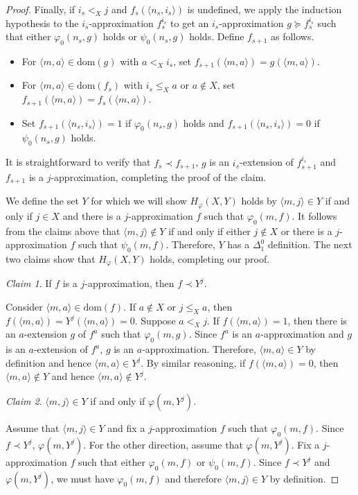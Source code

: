 \documentclass{amsart}
\theoremstyle{definition}
\theoremstyle{remark}
\newtheorem*{claim}{Claim}
\begin{document}
\begin{proof}
Finally, if $i_s <_X j$ and $f_s(\langle n_s,i_s \rangle)$ is undefined, we apply the induction hypothesis to the $i_s$-approximation $f_s^{i_s}$ to get an $i_s$-approximation 
$g \succeq f_s^{i_s}$ such that either $\varphi_0(n_s,g)$ holds or $\psi_0(n_s,g)$ holds. Define $f_{s+1}$ as follows. 
\begin{itemize}
\item For $\langle m,a \rangle \in \text{dom}(g)$ with $a <_X i_s$, set $f_{s+1}(\langle m,a \rangle) = g(\langle m,a \rangle)$. 
\item For $\langle m,a \rangle \in \text{dom}(f_s)$ with $i_s \leq_X a$ or $a \not \in X$, set $f_{s+1}(\langle m,a \rangle) = f_s(\langle m,a \rangle)$.
\item Set $f_{s+1}(\langle n_s,i_s \rangle) = 1$ if $\varphi_0(n_s,g)$ holds and $f_{s+1}(\langle n_s,i_s \rangle) = 0$ if $\psi_0(n_s,g)$ holds. 
\end{itemize}
It is straightforward to verify that $f_s \prec f_{s+1}$, $g$ is an $i_s$-extension of $f_{s+1}^{i_s}$ and $f_{s+1}$ is a $j$-approximation, completing the proof of the claim.

We define the set $Y$ for which we will show $H_{\varphi}(X,Y)$ holds by $\langle m,j \rangle \in Y$ if and only if $j \in X$ and there is a $j$-approximation $f$ such that $\varphi_0(m,f)$. It follows from the claims above that 
$\langle m,j \rangle \not \in Y$ if and only if either $j \not \in X$ or there is a $j$-approximation $f$ such that $\psi_0(m,f)$. Therefore, $Y$ has a $\Delta^0_1$ definition. 
The next two claims show that $H_{\varphi}(X,Y)$ holds, completing our proof.

\begin{claim}
If $f$ is a $j$-approximation, then $f \prec Y^j$. 
\end{claim}

Consider $\langle m,a \rangle \in \text{dom}(f)$. If $a \not \in X$ or $j \leq_X a$, then $f(\langle m,a \rangle) = Y^j(\langle m,a \rangle) = 0$. Suppose $a <_X j$. If 
$f(\langle m,a \rangle) = 1$, then there is an $a$-extension $g$ of $f^a$ such that $\varphi_0(m,g)$. Since $f^a$ is an $a$-approximation and $g$ is an $a$-extension of 
$f^a$, $g$ is an $a$-approximation. Therefore, $\langle m,a \rangle \in Y$ by definition and hence $\langle m,a \rangle \in Y^j$. By similar reasoning, 
if $f(\langle m,a \rangle) = 0$, then $\langle m,a \rangle \not \in Y$ and hence $\langle m,a \rangle \not \in Y^j$. 

\begin{claim}
$\langle m,j \rangle \in Y$ if and only if $\varphi(m,Y^j)$. 
\end{claim}

Assume that $\langle m,j \rangle \in Y$ and fix a $j$-approximation $f$ such that $\varphi_0(m,f)$. Since $f \prec Y^j$, $\varphi(m,Y^j)$. 
For the other direction, assume that $\varphi(m,Y^j)$. Fix a $j$-approximation $f$ such that either $\varphi_0(m,f)$ or $\psi_0(m,f)$. Since $f \prec Y^j$ and 
$\varphi(m,Y^j)$, we must have $\varphi_0(m,f)$ and therefore $\langle m,j \rangle \in Y$ by definition. 
\end{proof}
\end{document}
